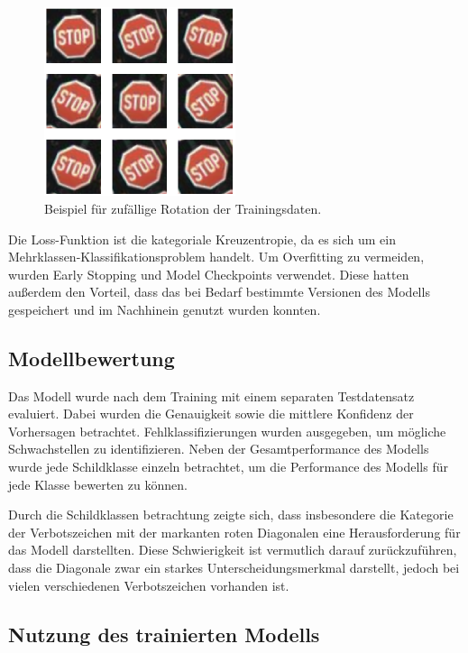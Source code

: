 \documentclass[runningheads]{llncs}
\begin{document}
\begin{figure}[H]
    \centering
    \includegraphics[width=0.5\textwidth]{images/RandomRotation.png}
    \caption{Beispiel für zufällige Rotation der Trainingsdaten.}
    \label{fig4}
\end{figure}

Die Loss-Funktion ist die kategoriale Kreuzentropie, da es sich um ein Mehrklassen-Klassifikationsproblem handelt.
Um Overfitting zu vermeiden, wurden Early Stopping und Model Checkpoints verwendet. Diese hatten außerdem den Vorteil, dass
das bei Bedarf bestimmte Versionen des Modells gespeichert und im Nachhinein genutzt wurden konnten.

\subsection{Modellbewertung}
Das Modell wurde nach dem Training mit einem separaten Testdatensatz evaluiert. Dabei wurden die Genauigkeit sowie die mittlere
Konfidenz der Vorhersagen betrachtet. Fehlklassifizierungen wurden ausgegeben, um mögliche Schwachstellen zu identifizieren.
Neben der Gesamtperformance des Modells wurde jede Schildklasse einzeln betrachtet, um die Performance des Modells für jede Klasse bewerten zu können.

Durch die Schildklassen betrachtung zeigte sich, dass insbesondere die Kategorie der Verbotszeichen mit der markanten roten
Diagonalen eine Herausforderung für das Modell darstellten. Diese Schwierigkeit ist vermutlich darauf zurückzuführen, dass die Diagonale
zwar ein starkes Unterscheidungsmerkmal darstellt, jedoch bei vielen verschiedenen Verbotszeichen vorhanden ist.

\subsection{Nutzung des trainierten Modells}
\end{document}
